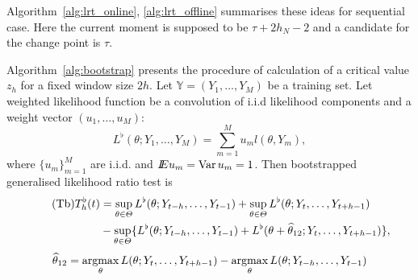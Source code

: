 Algorithm~\ref{alg:lrt_online}, \ref{alg:lrt_offline} summarises these ideas for sequential case. Here the current moment is supposed to be ${\tau + 2h_N - 2}$ and a candidate for the change point is $\tau$.

Algorithm~\ref{alg:bootstrap} presents the procedure of calculation of a critical value $z_h$ for a fixed window size $2h$. Let $\mathbb{Y} = (Y_1,..., Y_M)$ be a training set. Let weighted likelihood function be a convolution of i.i.d likelihood components and a weight vector $(u_1,\ldots,u_M)$: 
\begin{equation*}\label{Lb}\tag{Lb}
L^{\flat}(\theta; Y_1,\ldots, Y_M) = \sum_{m = 1}^{M} u_m l(\theta, Y_m),
\end{equation*}
where $\{u_m\}_{m = 1}^M$ are i.i.d. and $I\!\!E u_m = \operatorname{Var} u_m = 1$. Then bootstrapped generalised likelihood ratio test is
\begin{align*}\label{Tb}\tag{Tb}
T_{h}^{\flat}(t) &= \sup_{\theta \in \Theta}L^{\flat}(\theta; \YLL) + \sup_{\theta \in \Theta}L^{\flat}(\theta; \YRR) \\
&-\sup_{\theta \in \Theta}\{L^{\flat}(\theta; \YLL) + L^{\flat}(\theta + \widehat{\theta}_{12}; \YRR)\},
\end{align*}
\[
\widehat{\theta}_{12} = \argmax_{\theta} L(\theta; \YRR) - \argmax_{\theta} L(\theta; \YLL)
\]


